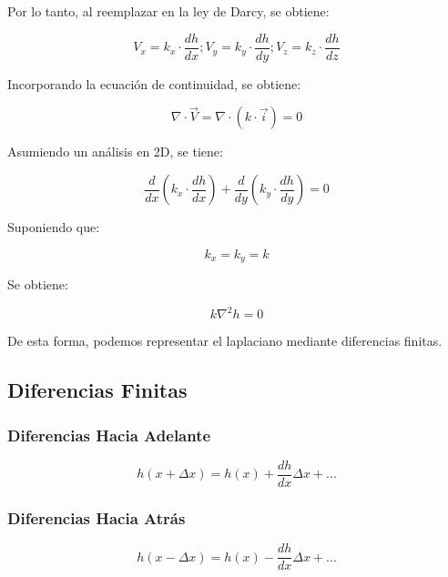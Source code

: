 Por lo tanto, al reemplazar en la ley de Darcy, se obtiene:

\begin{equation}
    V_x = k_x\cdot \frac{dh}{dx}; V_y = k_y\cdot \frac{dh}{dy}; V_z = k_z\cdot \frac{dh}{dz}
\end{equation}

Incorporando la ecuación de continuidad, se obtiene:

\begin{equation}
    \nabla \cdot \vec{V} = \nabla \cdot (k \cdot \vec{i}) = 0
\end{equation}

Asumiendo un análisis en 2D, se tiene:

\begin{equation}
    \frac{d}{dx}(k_x \cdot \frac{dh}{dx}) + \frac{d}{dy}(k_y \cdot \frac{dh}{dy}) = 0
\end{equation}

Suponiendo que:

\begin{equation}
    k_x = k_y = k
\end{equation}

Se obtiene:

\begin{equation}
    k \nabla^2 h = 0
\end{equation}

De esta forma, podemos representar el laplaciano mediante diferencias finitas. \textbf{\cite{budhu_soil_2010}}

\subsection{Diferencias Finitas}

\subsubsection{Diferencias Hacia Adelante}

\begin{equation}
    h(x + \Delta x) = h(x) + \frac{dh}{dx} \Delta x + ...
\end{equation}

\subsubsection{Diferencias Hacia Atrás}

\begin{equation}
    h(x - \Delta x) = h(x) - \frac{dh}{dx} \Delta x + ...
\end{equation}

